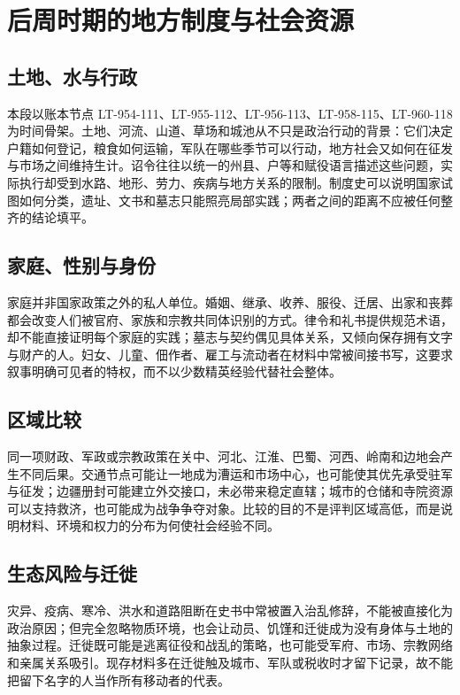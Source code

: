 \section{后周时期的地方制度与社会资源}
\label{sec:later-five-dynasties-local-institutions}

\subsection{土地、水与行政}
本段以账本节点 LT-954-111、LT-955-112、LT-956-113、LT-958-115、LT-960-118 为时间骨架。土地、河流、山道、草场和城池从不只是政治行动的背景：它们决定户籍如何登记，粮食如何运输，军队在哪些季节可以行动，地方社会又如何在征发与市场之间维持生计。诏令往往以统一的州县、户等和赋役语言描述这些问题，实际执行却受到水路、地形、劳力、疾病与地方关系的限制。制度史可以说明国家试图如何分类，遗址、文书和墓志只能照亮局部实践；两者之间的距离不应被任何整齐的结论填平。

\subsection{家庭、性别与身份}
家庭并非国家政策之外的私人单位。婚姻、继承、收养、服役、迁居、出家和丧葬都会改变人们被官府、家族和宗教共同体识别的方式。律令和礼书提供规范术语，却不能直接证明每个家庭的实践；墓志与契约偶见具体关系，又倾向保存拥有文字与财产的人。妇女、儿童、佃作者、雇工与流动者在材料中常被间接书写，这要求叙事明确可见者的特权，而不以少数精英经验代替社会整体。

\subsection{区域比较}
同一项财政、军政或宗教政策在关中、河北、江淮、巴蜀、河西、岭南和边地会产生不同后果。交通节点可能让一地成为漕运和市场中心，也可能使其优先承受驻军与征发；边疆册封可能建立外交接口，未必带来稳定直辖；城市的仓储和寺院资源可以支持救济，也可能成为战争争夺对象。比较的目的不是评判区域高低，而是说明材料、环境和权力的分布为何使社会经验不同。

\subsection{生态风险与迁徙}
灾异、疫病、寒冷、洪水和道路阻断在史书中常被置入治乱修辞，不能被直接化为政治原因；但完全忽略物质环境，也会让动员、饥馑和迁徙成为没有身体与土地的抽象过程。迁徙既可能是逃离征役和战乱的策略，也可能受军府、市场、宗教网络和亲属关系吸引。现存材料多在迁徙触及城市、军队或税收时才留下记录，故不能把留下名字的人当作所有移动者的代表。

